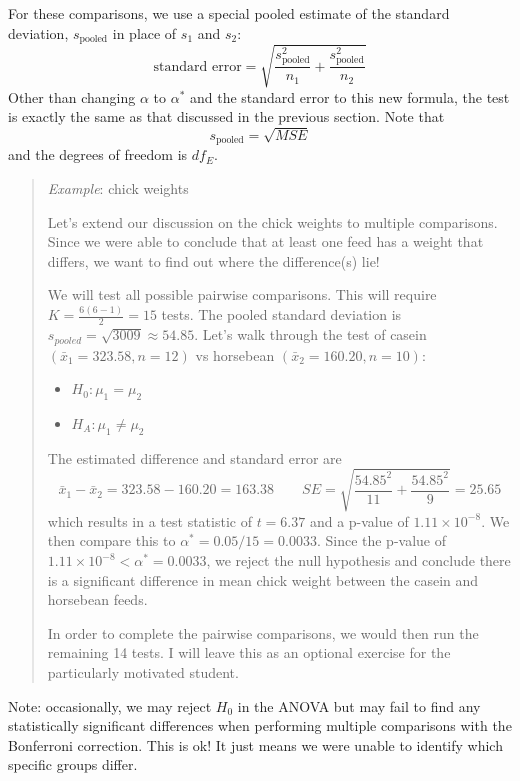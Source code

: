 \documentclass[
]{book}
\providecommand{\tightlist}{%
  \setlength{\itemsep}{0pt}\setlength{\parskip}{0pt}}
\begin{document}
For these comparisons, we use a special pooled estimate of the standard deviation, \(s_{\text{pooled}}\) in place of \(s_1\) and \(s_2\): \[\text{standard error} = \sqrt{\frac{s_{\text{pooled}}^2}{n_1} + \frac{s_{\text{pooled}}^2}{n_2}}\] Other than changing \(\alpha\) to \(\alpha^*\) and the standard error to this new formula, the test is exactly the same as that discussed in the previous section. Note that \[s_{\text{pooled}} = \sqrt{MSE}\] and the degrees of freedom is \(df_E\).

\begin{quote}
\emph{Example}: chick weights

Let's extend our discussion on the chick weights to multiple comparisons. Since we were able to conclude that at least one feed has a weight that differs, we want to find out where the difference(s) lie!

We will test all possible pairwise comparisons. This will require \(K = \frac{6(6-1)}{2} = 15\) tests. The pooled standard deviation is \(s_{pooled} = \sqrt{3009} \approx 54.85\). Let's walk through the test of casein \((\bar{x}_1 = 323.58, n=12)\) vs horsebean \((\bar{x}_2 = 160.20, n=10)\):

\begin{itemize}
\tightlist
\item
  \(H_0: \mu_1 = \mu_2\)
\item
  \(H_A: \mu_1 \ne \mu_2\)
\end{itemize}

The estimated difference and standard error are \[\bar{x}_1 - \bar{x}_2 = 323.58 - 160.20 = 163.38 \quad\quad SE = \sqrt{\frac{54.85^2}{11}+\frac{54.85^2}{9}} = 25.65\] which results in a test statistic of \(t=6.37\) and a p-value of \(1.11\times10^{-8}\). We then compare this to \(\alpha^* = 0.05/15 = 0.0033\). Since the p-value of \(1.11\times10^{-8} < \alpha^* = 0.0033\), we reject the null hypothesis and conclude there is a significant difference in mean chick weight between the casein and horsebean feeds.

In order to complete the pairwise comparisons, we would then run the remaining 14 tests. I will leave this as an optional exercise for the particularly motivated student.
\end{quote}

Note: occasionally, we may reject \(H_0\) in the ANOVA but may fail to find any statistically significant differences when performing multiple comparisons with the Bonferroni correction. This is ok! It just means we were unable to identify which specific groups differ.

  
\end{document}
